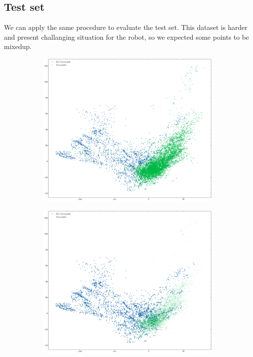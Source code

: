 \documentclass[../document.tex]{subfiles}
\begin{document}
\subsection{Test set}
We can apply the same procedure to evaluate the test set. This dataset is harder and present challanging situation for the robot, so we expected some points to be mixedup.
\begin{figure}[H]
    \centering
    \begin{subfigure}[b]{1\textwidth}
        \includegraphics[width=\linewidth]{../img/5/pca/pca-test.png}
    \end{subfigure}
    \begin{subfigure}[b]{0.48\textwidth}
        \includegraphics[width=\linewidth]{../img/5/pca/pca-test-0.png}

\end{subfigure}
\end{figure}
\end{document}
